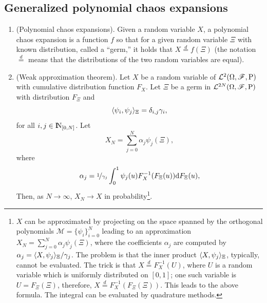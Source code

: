 \documentclass[a4paper,10pt]{scrbook}
\begin{document}
\subsection{Generalized polynomial chaos expansions}
\begin{enumerate}
 \item (Polynomial chaos expansions). Given a random variable \(X\), a polynomial chaos expansion 
       is a function \(f\) so that for a given random variable \(\Xi\) with known distribution, 
       called a ``germ,'' it holds that \(X \overset{d}{=} f(\Xi)\) (the notation \(\overset{d}{=}\)
       means that the distributions of the two random variables are equal).
 \item (Weak approximation theorem). Let \(X\) be a random variable of \(\mathcal{L}^2(\Omega,\mathscr{F},\mathrm{P})\) with 
       cumulative distribution function \(F_X\). Let \(\Xi\) be a germ in \(\mathcal{L}^{2N}(\Omega,\mathscr{F},\mathrm{P})\)
       with distribution \(F_\Xi\) and 
       \[
        \langle\psi_i, \psi_j\rangle_\Xi = \delta_{i,j}\gamma_i,
       \]
       for all \(i,j\in\N_{[0,N]}\). Let
       \[
        X_N = \sum_{j=0}^{N}\alpha_j \psi_j(\Xi),
       \]
       where 
       \[
        \alpha_j = \nicefrac{1}{\gamma_j} \int_0^1 \psi_j(u) F_{X}^{-1}(F_{\Xi}(u)) \mathrm{d} F_{\Xi}(u),
       \]
       Then, as \(N\to\infty\), \(X_N\to X\) in probability\footnote{%
	      \(X\) can be approximated by projecting on the space spanned by the 
	      orthogonal polynomials \(\mathcal{M} = \{\psi_i\}_{i=0}^{N}\) leading
	      to an approximation \(X_N = \sum_{j=0}^{N} \alpha_j \psi_j(\Xi)\), where
	      the coefficients \(\alpha_j\) are computed by \(\alpha_j {}={} \langle X, \psi_j\rangle_\Xi/\gamma_j\).
	      The problem is that the inner product \(\langle X, \psi_j\rangle_\Xi\), typically, cannot be 
	      evaluated.
	      The trick is that \(X \overset{d}{=} F_X^{-1}(U)\), where \(U\) is a random variable
	      which is uniformly distributed on \([0,1]\); one such variable is \(U=F_{\Xi}(\Xi)\), 
	      therefore, \(X \overset{d}{=} F_{X}^{-1}(F_{\Xi}(\Xi))\). This leads to the above formula.
	      The integral can be evaluated by quadrature methods.
       }.


\end{enumerate}
\end{document}
